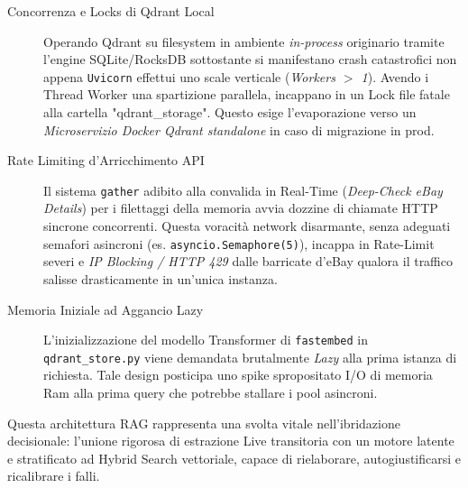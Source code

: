\begin{description}
    \item[Concorrenza e Locks di Qdrant Local] Operando Qdrant su filesystem in ambiente \textit{in-process} originario tramite l'engine SQLite/RocksDB sottostante si manifestano crash catastrofici non appena \texttt{Uvicorn} effettui uno scale verticale (\textit{Workers $>$ 1}). Avendo i Thread Worker una spartizione parallela, incappano in un Lock file fatale alla cartella "qdrant\_storage". Questo esige l'evaporazione verso un \textit{Microservizio Docker Qdrant standalone} in caso di migrazione in prod.
    
    \item[Rate Limiting d'Arricchimento API] Il sistema \texttt{gather} adibito alla convalida in Real-Time (\textit{Deep-Check eBay Details}) per i filettaggi della memoria avvia dozzine di chiamate HTTP sincrone concorrenti. Questa voracità network disarmante, senza adeguati semafori asincroni (es. \texttt{asyncio.Semaphore(5)}), incappa in Rate-Limit severi e \textit{IP Blocking / HTTP 429} dalle barricate d'eBay qualora il traffico salisse drasticamente in un'unica instanza.
    
    \item[Memoria Iniziale ad Aggancio Lazy] L'inizializzazione del modello Transformer di \texttt{fastembed} in \texttt{qdrant\_store.py} viene demandata brutalmente \textit{Lazy} alla prima istanza di richiesta. Tale design posticipa uno spike spropositato I/O di memoria Ram alla prima query che potrebbe stallare i pool asincroni.
\end{description}
    
Questa architettura RAG rappresenta una svolta vitale nell'ibridazione decisionale: l'unione rigorosa di estrazione Live transitoria con un motore latente e stratificato ad Hybrid Search vettoriale, capace di rielaborare, autogiustificarsi e ricalibrare i falli.
